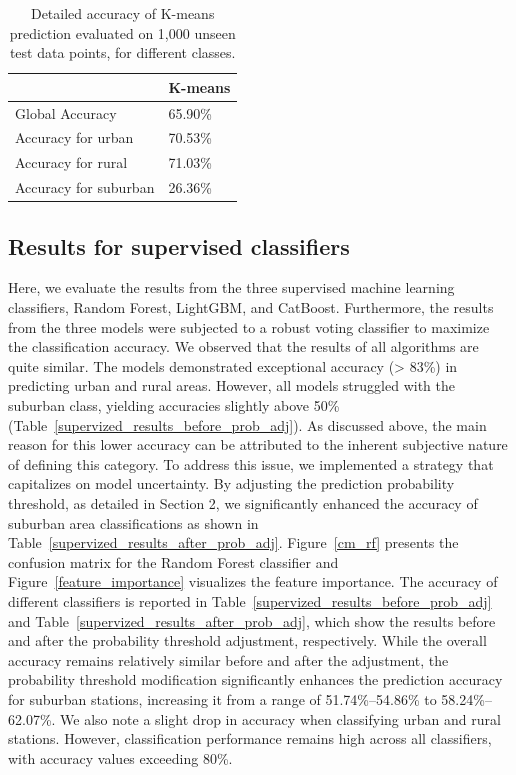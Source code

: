 \documentclass[gmd, manuscript]{copernicus}
\begin{document}
\begin{table}[htb!]
\centering
\caption{Detailed accuracy of K-means prediction evaluated on 1,000 unseen test data points, for different classes.}
\begin{tabular}{|l|l|}
\hline
                      & K-means \\ \hline
Global Accuracy       & 65.90\%  \\ \hline
Accuracy for urban    & 70.53\% \\ \hline
Accuracy for rural    & 71.03\% \\ \hline
Accuracy for suburban & 26.36\% \\ \hline
\end{tabular}
 \label{kmeans_acc}
\end{table}

\subsection{Results for supervised classifiers}
Here, we evaluate the results from the three supervised machine learning classifiers, Random Forest, LightGBM, and CatBoost. Furthermore, the results from the three models were subjected to a robust voting classifier to maximize the classification accuracy. We observed that the results of all algorithms are quite similar. The models demonstrated exceptional accuracy (> 83\%) in predicting urban and rural areas. However, all models struggled with the suburban class, yielding accuracies slightly above 50\% (Table~\ref{supervized_results_before_prob_adj}). As discussed above, the main reason for this lower accuracy can be attributed to the inherent subjective nature of defining this category. To address this issue, we implemented a  strategy that capitalizes on model uncertainty. By adjusting the prediction probability threshold, as detailed in Section 2, we significantly enhanced the accuracy of suburban area classifications as shown in Table~\ref{supervized_results_after_prob_adj}. 
Figure~\ref{cm_rf} presents the confusion matrix for the Random Forest classifier and Figure~\ref{feature_importance} visualizes the feature importance. The accuracy of different classifiers is reported in Table~\ref{supervized_results_before_prob_adj} and Table~\ref{supervized_results_after_prob_adj}, which show the results before and after the probability threshold adjustment, respectively. While the overall accuracy remains relatively similar before and after the adjustment, the probability threshold modification significantly enhances the prediction accuracy for suburban stations, increasing it from a range of 51.74\%–54.86\% to 58.24\%–62.07\%. We also note a slight drop in accuracy when classifying urban and rural stations. However, classification performance remains high across all classifiers, with accuracy values exceeding 80\%. 
\end{document}
